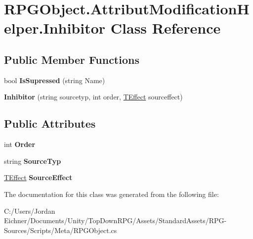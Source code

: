 \hypertarget{class_r_p_g_object_1_1_attribut_modification_helper_1_1_inhibitor}{}\section{R\+P\+G\+Object.\+Attribut\+Modification\+Helper.\+Inhibitor Class Reference}
\label{class_r_p_g_object_1_1_attribut_modification_helper_1_1_inhibitor}
\subsection*{Public Member Functions}
\begin{DoxyCompactItemize}
\item 
\hypertarget{class_r_p_g_object_1_1_attribut_modification_helper_1_1_inhibitor_a9ead375ce3150b3b12f08b5e4a2e602f}{}bool {\bfseries Is\+Supressed} (string Name)\label{class_r_p_g_object_1_1_attribut_modification_helper_1_1_inhibitor_a9ead375ce3150b3b12f08b5e4a2e602f}

\item 
\hypertarget{class_r_p_g_object_1_1_attribut_modification_helper_1_1_inhibitor_ab804cf735fc66c0925e3d7cc5ed14fe3}{}{\bfseries Inhibitor} (string sourcetyp, int order, \hyperlink{class_t_effect}{T\+Effect} sourceffect)\label{class_r_p_g_object_1_1_attribut_modification_helper_1_1_inhibitor_ab804cf735fc66c0925e3d7cc5ed14fe3}

\end{DoxyCompactItemize}
\subsection*{Public Attributes}
\begin{DoxyCompactItemize}
\item 
\hypertarget{class_r_p_g_object_1_1_attribut_modification_helper_1_1_inhibitor_a7f9bd8077abc15c17733da40d3e9b552}{}int {\bfseries Order}\label{class_r_p_g_object_1_1_attribut_modification_helper_1_1_inhibitor_a7f9bd8077abc15c17733da40d3e9b552}

\item 
\hypertarget{class_r_p_g_object_1_1_attribut_modification_helper_1_1_inhibitor_a69ac088f734412ea446126566558599f}{}string {\bfseries Source\+Typ}\label{class_r_p_g_object_1_1_attribut_modification_helper_1_1_inhibitor_a69ac088f734412ea446126566558599f}

\item 
\hypertarget{class_r_p_g_object_1_1_attribut_modification_helper_1_1_inhibitor_a121e1d2d77017af1a8cd50eea75a16b9}{}\hyperlink{class_t_effect}{T\+Effect} {\bfseries Source\+Effect}\label{class_r_p_g_object_1_1_attribut_modification_helper_1_1_inhibitor_a121e1d2d77017af1a8cd50eea75a16b9}

\end{DoxyCompactItemize}


The documentation for this class was generated from the following file\+:\begin{DoxyCompactItemize}
\item 
C\+:/\+Users/\+Jordan Eichner/\+Documents/\+Unity/\+Top\+Down\+R\+P\+G/\+Assets/\+Standard\+Assets/\+R\+P\+G-\/\+Sources/\+Scripts/\+Meta/R\+P\+G\+Object.\+cs\end{DoxyCompactItemize}
